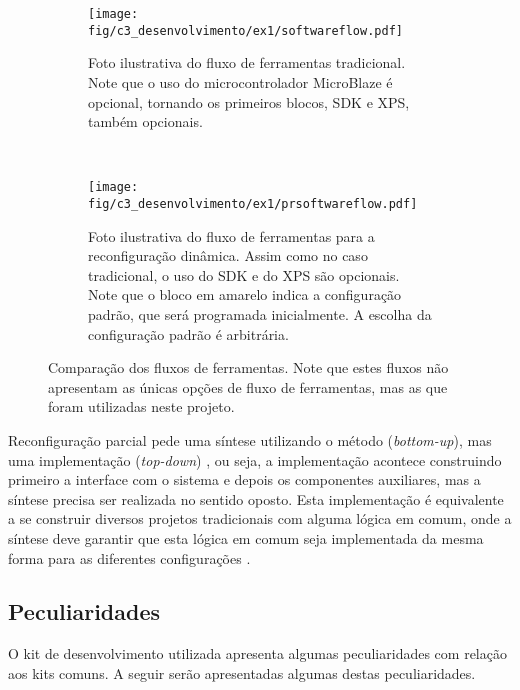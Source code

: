 \documentclass[11pt,a4paper,oneside]{book}
\begin{document}
\begin{figure}[h]
	\centering
       	\begin{subfigure}[b]{\textwidth}
       		\centering
		\texttt{[image: fig/c3\_desenvolvimento/ex1/softwareflow.pdf]}
		\caption{Foto ilustrativa do fluxo de ferramentas tradicional. Note que o uso do microcontrolador MicroBlaze é opcional, tornando os primeiros blocos, SDK e XPS, também opcionais.}
		\label{fig:ex1:softwareflow}
	\end{subfigure}\\
	\begin{subfigure}[b]{\textwidth}
		\centering
		\texttt{[image: fig/c3\_desenvolvimento/ex1/prsoftwareflow.pdf]}
		\caption{Foto ilustrativa do fluxo de ferramentas para a reconfiguração dinâmica. Assim como no caso tradicional, o uso do SDK e do XPS são opcionais. Note que o bloco em amarelo indica a configuração padrão, que será programada inicialmente. A escolha da configuração padrão é arbitrária.}
		\label{fig:ex1:prsoftwareflow}
	\end{subfigure}
	\caption{Comparação dos fluxos de ferramentas. Note que estes fluxos não apresentam as únicas opções de fluxo de ferramentas, mas as que foram utilizadas neste projeto.}
	\label{fig:ex1:softwareflow:comparacao}
\end{figure}

Reconfiguração parcial pede uma síntese utilizando o método  (\textit{bottom-up}), mas uma implementação  (\textit{top-down}) \cite{ug743}, ou seja, a implementação acontece construindo primeiro a interface com o sistema e depois os componentes auxiliares, mas a síntese precisa ser realizada no sentido oposto.
Esta implementação é equivalente a se construir diversos projetos tradicionais com alguma lógica em comum, onde a síntese deve garantir que esta lógica em comum seja implementada da mesma forma para as diferentes configurações \cite{ug702}.

\subsection{Peculiaridades}
O kit de desenvolvimento utilizada apresenta algumas peculiaridades com relação aos kits comuns.
A seguir serão apresentadas algumas destas peculiaridades.
\end{document}

